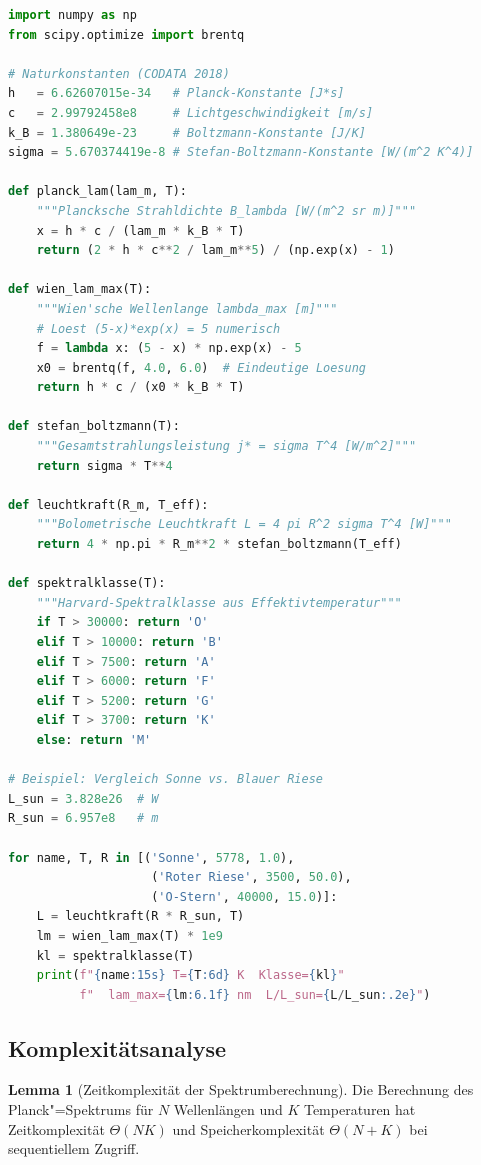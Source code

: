 ﻿\documentclass[a4paper,12pt]{article}
\theoremstyle{definition}
\newtheorem{lemma}{Lemma}
\begin{document}
\begin{lstlisting}[language=Python,
    caption={Vollständige Implementierung der Schwarzkörperphysik},
    label={lst:planck}]
import numpy as np
from scipy.optimize import brentq

# Naturkonstanten (CODATA 2018)
h   = 6.62607015e-34   # Planck-Konstante [J*s]
c   = 2.99792458e8     # Lichtgeschwindigkeit [m/s]
k_B = 1.380649e-23     # Boltzmann-Konstante [J/K]
sigma = 5.670374419e-8 # Stefan-Boltzmann-Konstante [W/(m^2 K^4)]

def planck_lam(lam_m, T):
    """Plancksche Strahldichte B_lambda [W/(m^2 sr m)]"""
    x = h * c / (lam_m * k_B * T)
    return (2 * h * c**2 / lam_m**5) / (np.exp(x) - 1)

def wien_lam_max(T):
    """Wien'sche Wellenlange lambda_max [m]"""
    # Loest (5-x)*exp(x) = 5 numerisch
    f = lambda x: (5 - x) * np.exp(x) - 5
    x0 = brentq(f, 4.0, 6.0)  # Eindeutige Loesung
    return h * c / (x0 * k_B * T)

def stefan_boltzmann(T):
    """Gesamtstrahlungsleistung j* = sigma T^4 [W/m^2]"""
    return sigma * T**4

def leuchtkraft(R_m, T_eff):
    """Bolometrische Leuchtkraft L = 4 pi R^2 sigma T^4 [W]"""
    return 4 * np.pi * R_m**2 * stefan_boltzmann(T_eff)

def spektralklasse(T):
    """Harvard-Spektralklasse aus Effektivtemperatur"""
    if T > 30000: return 'O'
    elif T > 10000: return 'B'
    elif T > 7500: return 'A'
    elif T > 6000: return 'F'
    elif T > 5200: return 'G'
    elif T > 3700: return 'K'
    else: return 'M'

# Beispiel: Vergleich Sonne vs. Blauer Riese
L_sun = 3.828e26  # W
R_sun = 6.957e8   # m

for name, T, R in [('Sonne', 5778, 1.0),
                    ('Roter Riese', 3500, 50.0),
                    ('O-Stern', 40000, 15.0)]:
    L = leuchtkraft(R * R_sun, T)
    lm = wien_lam_max(T) * 1e9
    kl = spektralklasse(T)
    print(f"{name:15s} T={T:6d} K  Klasse={kl}"
          f"  lam_max={lm:6.1f} nm  L/L_sun={L/L_sun:.2e}")
\end{lstlisting}

\subsection{Komplexitätsanalyse}

\begin{lemma}[Zeitkomplexität der Spektrumberechnung]
\label{lem:komplex}
    Die Berechnung des Planck"=Spektrums für $N$ Wellenlängen und $K$
    Temperaturen hat Zeitkomplexität $\Theta(NK)$ und Speicherkomplexität
    $\Theta(N + K)$ bei sequentiellem Zugriff.
\end{lemma}
\end{document}
